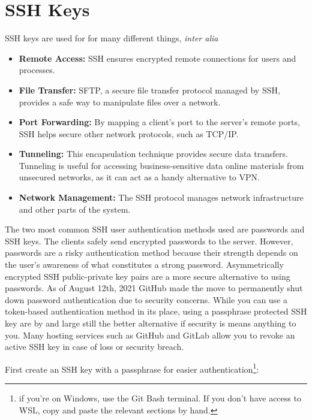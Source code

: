 \section{SSH Keys}

\begin{flushleft}
	SSH keys are used for for many different things, \textit{inter alia}
\end{flushleft}

\begin{itemize}
	\item \textbf{Remote Access:} SSH ensures encrypted remote connections for users
	      and processes.
	\item \textbf{File Transfer:} SFTP, a secure file transfer protocol managed by SSH,
	      provides a safe way to manipulate files over a network.
	\item \textbf{Port Forwarding:} By mapping a client's port to the server's remote ports,
	      SSH helps secure other network protocols, such as TCP/IP.
	\item \textbf{Tunneling:} This encapsulation technique provides secure data transfers.
	      Tunneling is useful for accessing business-sensitive data online materials from unsecured
	      networks, as it can act as a handy alternative to VPN.
	\item \textbf{Network Management:} The SSH protocol manages network infrastructure and
	      other parts of the system.
\end{itemize}

\begin{flushleft}
	The two most common SSH user authentication methods used are passwords and SSH keys.
	The clients safely send encrypted passwords to the server. However, passwords are a
	risky authentication method because their strength depends on the user’s awareness of
	what constitutes a strong password. Asymmetrically encrypted SSH public-private key
	pairs are a more secure alternative to using passwords. As of August 12th, 2021 GitHub
	made the move to permanently shut down password authentication due to security concerns.
	While you can use a token-based authentication method in its place, using a passphrase
	protected SSH key are by and large still the better alternative if security is means
	anything to you. Many hosting services such as GitHub and GitLab allow you to revoke
	an active SSH key in case of loss or security breach.
\end{flushleft}

\begin{flushleft}
	First create an SSH key with a passphrase for easier authentication\footnote{if you're on Windows,
		use the Git Bash terminal. If you don't have access to WSL, copy and paste the relevant
		sections by hand.}:
\end{flushleft}

